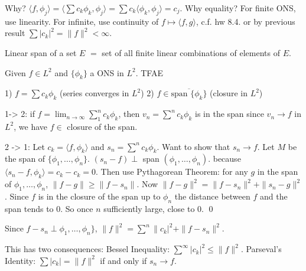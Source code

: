 Why? $\langle f, \phi_j \rangle = \langle \sum c_k \phi_k, \phi_j \rangle = \sum c_k \langle \phi_k, \phi_j \rangle= c_j$. Why equality? For finite ONS, use linearity. For infinite, use continuity of $f \mapsto \langle f,g \rangle$, c.f. hw 8.4. or by previous result $\sum |c_k|^2= \|f\|^2< \infty$. 


Linear span of a set $E$ $=$ set of all finite linear combinations of elements of $E$. 


\begin{thm}
Given $f \in L^2$ and $\{ \phi_k \}$ a ONS in $L^2$. TFAE

1) $f= \sum c_k \phi_k$ (series converges in $L^2$)
2) $f \in \overline{\text{span }\{\phi_k\}}$ (closure in $L^2$)
\end{thm}

1-> 2: if $f= \lim_{n \to \infty} \sum_1^n c_k \phi_k$, then $v_n = \sum^n c_k \phi_k$ is in the span since $v_n \to f$ in $L^2$, we have $f \in $ closure of the span. 

2 -> 1: Let $c_k= \langle f, \phi_k \rangle$ and $s_n= \sum^n c_k \phi_k$. Want to show that $s_n \to f$. Let $M$ be the span of $\{\phi_1,\ldots,\phi_n\}$. $(s_n-f) \perp $ span $(\phi_1,\ldots,\phi_n)$. because $\langle s_n -f, \phi_k \rangle= c_k-c_k=0$. Then use Pythagorean Theorem: for any $g$ in the span of $\phi_1,\ldots,\phi_n$, $\|f-g\| \geq \|f-s_n\|$. Now $\|f-g\|^2= \|f-s_n\|^2 + \|s_n-g\|^2$. Since $f$ is in the closure of the span up to $\phi_n$ the distance between $f$ and the span tends to 0. So once $n$ sufficiently large, close to 0. \qed \\


\begin{cor}
Since $f-s_n \perp \phi_1,\ldots,\phi_n\}$, $\|f\|^2= \sum^n \|c_k|^2 + \|f-s_n\|^2$.  
\end{cor}

This has two consequences: Bessel Inequality: $\sum^\infty |c_k|^2 \leq \|f\|^2$. Parseval's Identity: $\sum |c_k| = \|f\|^2$ if and only if $s_n \to f$. 












































